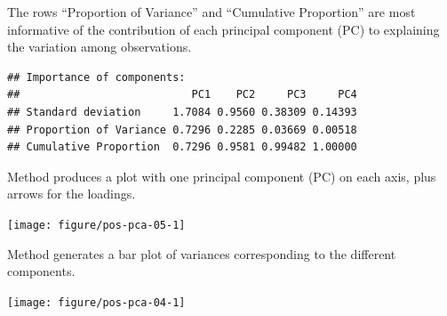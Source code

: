 \documentclass[krantz2]{krantz}\usepackage{knitr}%
\begin{document}
The rows ``Proportion of Variance'' and ``Cumulative Proportion'' are most informative of the contribution of each principal component (PC) to explaining the variation among observations.

\begin{knitrout}\footnotesize
{}\color{fgcolor}\begin{kframe}
\begin{alltt}
\end{alltt}
\begin{verbatim}
## Importance of components:
##                           PC1    PC2     PC3     PC4
## Standard deviation     1.7084 0.9560 0.38309 0.14393
## Proportion of Variance 0.7296 0.2285 0.03669 0.00518
## Cumulative Proportion  0.7296 0.9581 0.99482 1.00000
\end{verbatim}
\end{kframe}
\end{knitrout}



Method  produces a plot with one principal component (PC) on each axis, plus arrows for the loadings.

\begin{knitrout}\footnotesize
{}\color{fgcolor}\begin{kframe}
\begin{alltt}
\end{alltt}
\end{kframe}

{\centering \texttt{[image: figure/pos-pca-05-1]} 

}



\end{knitrout}



Method  generates a bar plot of variances corresponding to the different components.

\begin{knitrout}\footnotesize
{}\color{fgcolor}\begin{kframe}
\begin{alltt}
\end{alltt}
\end{kframe}

{\centering \texttt{[image: figure/pos-pca-04-1]} 

}



\end{knitrout}
\end{document}
